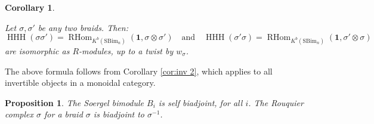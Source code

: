 \documentclass[12pt]{amsart}
\numberwithin{equation}{section}
\newtheorem{proposition}[theorem]{Proposition}
\newtheorem{corollary}[theorem]{Corollary}
\theoremstyle{definition}
\theoremstyle{remark}
\DeclareMathOperator{\RHom}{{RHom}}
\DeclareMathOperator{\HHH}{HHH}
\newcommand{\CC}{\mathbb{C}}
\renewcommand{\1}{\mathbf{1}}
\newcommand{\SBim}{\mathrm{SBim}}
\begin{document}





\begin{corollary}
\label{cor:trace twisted identity}

Let $\sigma,\sigma'$ be any two braids. Then:
$$
\HHH(\sigma\sigma') = \RHom_{K^b(\SBim_n)}(\1,\sigma \otimes \sigma') \quad \text{and} \quad \HHH(\sigma'\sigma) = \RHom_{K^b(\SBim_n)}(\1,\sigma' \otimes \sigma)
$$
are isomorphic as $R$-modules, up to a twist by $w_{\sigma}$.

\end{corollary}

The above formula follows from Corollary \ref{cor:inv 2}, which applies to all invertible objects in a monoidal category.
 

\begin{proposition}
The Soergel bimodule $B_i$ is self biadjoint, for all $i$. The Rouquier complex $\sigma$ for a braid $\sigma$ is biadjoint to $\sigma^{-1}$. 
\end{proposition}
\end{document}
